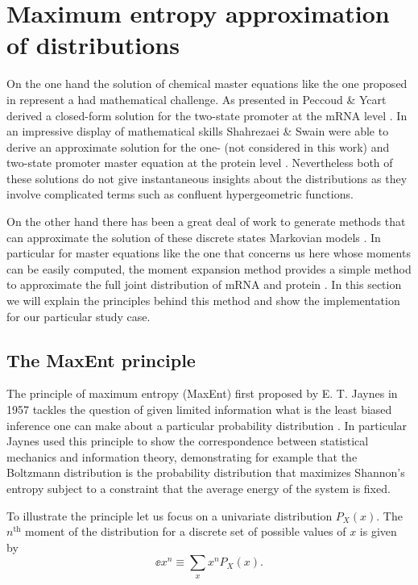 \section{Maximum entropy approximation of distributions}\label{supp_maxent}

On the one hand the solution of chemical master equations like the one proposed
in  represent a had mathematical challenge. As presented
in  Peccoud \& Ycart derived a closed-form solution
for the two-state promoter at the mRNA level \cite{Peccoud1995}. In an
impressive display of mathematical skills Shahrezaei \& Swain were able to
derive an approximate solution for the one- (not considered in this work) and
two-state promoter master equation at the protein level \cite{Shahrezaei2008}.
Nevertheless both of these solutions do not give instantaneous insights about
the distributions as they involve complicated terms such as confluent
hypergeometric functions.

On the other hand there has been a great deal of work to generate methods that
can approximate the solution of these discrete states Markovian models
\cite{Ale2013, Andreychenko2017, Frohlich2016, Schnoerr2017, Smadbeck2013,
Hasenauer2014, Dinh2016}. In particular for master equations like the one that
concerns us here whose moments can be easily computed, the moment expansion
method provides a simple method to approximate the full joint distribution of
mRNA and protein \cite{Smadbeck2013}. In this section we will explain the
principles behind this method and show the implementation for our particular
study case.

\subsection{The MaxEnt principle}

The principle of maximum entropy (MaxEnt) first proposed by E. T. Jaynes in 1957
tackles the question of given limited information what is the least biased
inference one can make about a particular probability distribution
\cite{Jaynes1957}. In particular Jaynes used this principle to show the
correspondence between statistical mechanics and information theory,
demonstrating for example that the Boltzmann distribution is the probability
distribution that maximizes Shannon's entropy subject to a constraint that the
average energy of the system is fixed.

To illustrate the principle let us focus on a univariate distribution $P_X(x)$.
The $n^{\text{th}}$ moment of the distribution for a discrete set of possible
values of $x$ is given by
\begin{equation}
  \ee{x^n} \equiv \sum_x x^n P_X(x).
  \label{eq_mom_ref}
\end{equation}

